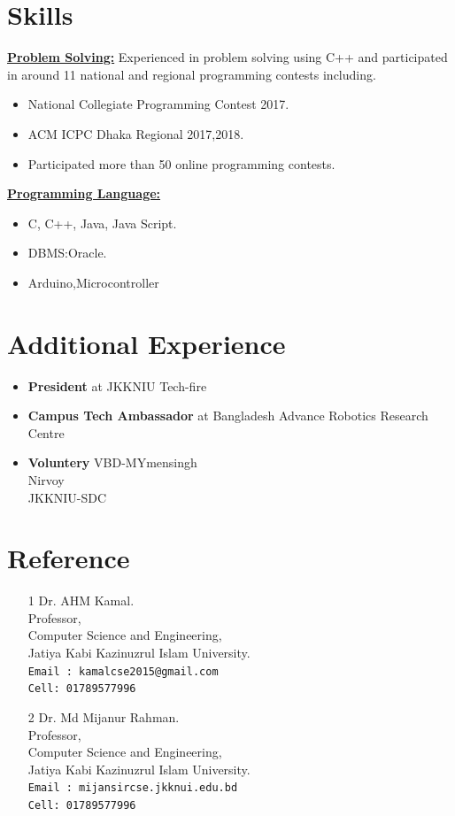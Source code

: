 \documentclass[a4paper,10pt]{article}
\begin{document}
	\section{Skills}
	\underline{\textbf{Problem Solving:}}
	Experienced in problem solving using C++ and participated in around 11 national and regional programming contests including.
	\begin{itemize}
		\item National Collegiate Programming Contest  2017.
		\item ACM ICPC Dhaka Regional 2017,2018.
		
		
		\item Participated more than 50 online programming contests.
	\end{itemize}
	
	\hspace{-5mm}\underline{\textbf{Programming Language:}}\\
	\begin{itemize}
		\item C, C++, Java, Java Script.
		\item DBMS:Oracle.
		\item Arduino,Microcontroller
	\end{itemize}
	
	\section{Additional Experience}
	\begin{itemize}
		\item \textbf{President} at JKKNIU Tech-fire
		\item \textbf{Campus Tech Ambassador} at Bangladesh Advance Robotics Research Centre
		\item \textbf{Voluntery} VBD-MYmensingh\\Nirvoy\\JKKNIU-SDC
	\end{itemize}
	
	\section{Reference}
	\begin{itemize}
		\item[1] Dr. AHM Kamal.\\
				 Professor,\\
				 Computer Science and Engineering,\\ 
				 Jatiya Kabi Kazinuzrul Islam University.\\
				 \texttt{Email : kamalcse2015@gmail.com}\\
				 \texttt{Cell: 01789577996}
		\item[2] Dr. Md Mijanur Rahman.\\
		Professor,\\
		Computer Science and Engineering,\\ 
		Jatiya Kabi Kazinuzrul Islam University.\\
		\texttt{Email : mijansircse.jkknui.edu.bd}\\
		\texttt{Cell: 01789577996}\\
	\end{itemize}
	
\end{document}

